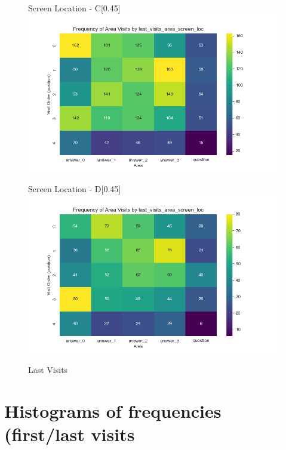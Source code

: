 \documentclass{article}
\begin{document}
\begin{figure}[H]
  \begin{subcaptionbox}{Screen Location - C\label{fig:sl_c}}[0.45\textwidth]
    {\centering\includegraphics[width=\linewidth]{plots/visits/matrix__last_visits_area_screen_loc_gatherers_C.png}}
  \end{subcaptionbox}
  \hfill
  \begin{subcaptionbox}{Screen Location - D\label{fig:sl_d}}[0.45\textwidth]
    {\centering\includegraphics[width=\linewidth]{plots/visits/matrix__last_visits_area_screen_loc_gatherers_D.png}}
  \end{subcaptionbox}
  
  \caption{Last Visits}
  \label{fig:fourimages4}
\end{figure}

\newpage
\section{Histograms of frequencies (first/last visits}
\end{document}
